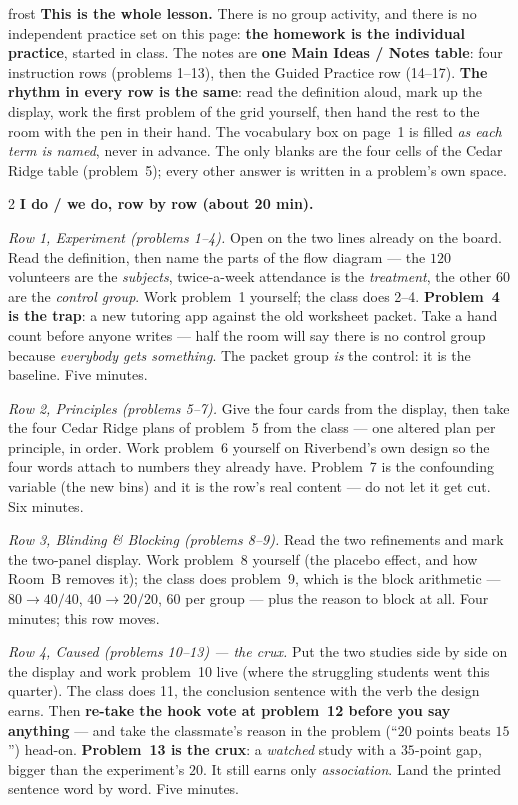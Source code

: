 \documentclass[10pt]{article}
\begin{document}
\boxguard
\begin{skillbox}{frost}
\textbf{This is the whole lesson.} There is no group activity, and there is no independent
practice set on this page: \textbf{the homework is the individual practice}, started in class.
The notes are \textbf{one Main Ideas / Notes table}: four instruction rows (problems 1--13),
then the Guided Practice row (14--17). \textbf{The rhythm in every row is the same}: read the
definition aloud, mark up the display, work the first problem of the grid yourself, then hand
the rest to the room with the pen in their hand. The vocabulary box on page~1 is filled
\emph{as each term is named}, never in advance. The only blanks are the four cells of the
Cedar Ridge table (problem~5); every other answer is written in a problem's own space.
\begin{multicols}{2}
\textbf{I do / we do, row by row (about 20 min).}

\emph{Row 1, Experiment (problems 1--4).} Open on the two lines already on the board. Read the
definition, then name the parts of the flow diagram --- the $120$ volunteers are the
\emph{subjects}, twice-a-week attendance is the \emph{treatment}, the other $60$ are the
\emph{control group}. Work problem~1 yourself; the class does 2--4. \textbf{Problem~4 is the
trap}: a new tutoring app against the old worksheet packet. Take a hand count before anyone
writes --- half the room will say there is no control group because \emph{everybody gets
something}. The packet group \emph{is} the control: it is the baseline. Five minutes.

\emph{Row 2, Principles (problems 5--7).} Give the four cards from the display, then take the
four Cedar Ridge plans of problem~5 from the class --- one altered plan per principle, in
order. Work problem~6 yourself on Riverbend's own design so the four words attach to numbers
they already have. Problem~7 is the confounding variable (the new bins) and it is the row's
real content --- do not let it get cut. Six minutes.

\emph{Row 3, Blinding \& Blocking (problems 8--9).} Read the two refinements and mark the
two-panel display. Work problem~8 yourself (the placebo effect, and how Room~B removes it);
the class does problem~9, which is the block arithmetic --- $80 \to 40/40$, $40 \to 20/20$,
$60$ per group --- plus the reason to block at all. Four minutes; this row moves.

\emph{Row 4, Caused (problems 10--13) --- the crux.} Put the two studies side by side on the
display and work problem~10 live (where the struggling students went this quarter). The class
does 11, the conclusion sentence with the verb the design earns. Then \textbf{re-take the hook
vote at problem~12 before you say anything} --- and take the classmate's reason in the problem
(``$20$ points beats $15$'') head-on. \textbf{Problem~13 is the crux}: a \emph{watched} study
with a $35$-point gap, bigger than the experiment's $20$. It still earns only
\emph{association}. Land the printed sentence word by word. Five minutes.


\end{multicols}
\end{skillbox}
\end{document}
